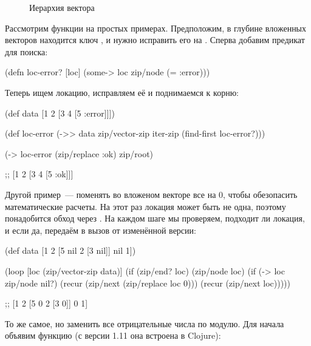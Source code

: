 \begin{figure}[ht!]
  \centering
  \caption{Иерархия вектора}
  \label{fig:chart-zip-12}
\end{figure}

Рассмотрим функции на простых примерах. Предположим, в глубине вложенных
векторов находится ключ , и нужно исправить его на . Сперва добавим
предикат для поиска:

\begin{english}
  \begin{clojure}
(defn loc-error? [loc]
  (some-> loc zip/node (= :error)))
  \end{clojure}
\end{english}

Теперь ищем локацию, исправляем её и поднимаемся к корню:

\begin{english}
  \begin{clojure}
(def data [1 2 [3 4 [5 :error]]])

(def loc-error
  (->> data
       zip/vector-zip
       iter-zip
       (find-first loc-error?)))

(-> loc-error
    (zip/replace :ok)
    zip/root)

;; [1 2 [3 4 [5 :ok]]]
  \end{clojure}
\end{english}

Другой пример~--- поменять во вложеном векторе все  на 0, чтобы обезопасить
математические расчеты. На этот раз локация может быть не одна, поэтому
понадобится обход через . На каждом шаге мы проверяем, подходит ли
локация, и если да, передаём в  вызов  от изменённой версии:

\begin{english}
  \begin{clojure}
(def data [1 2 [5 nil 2 [3 nil]] nil 1])

(loop [loc (zip/vector-zip data)]
  (if (zip/end? loc)
    (zip/node loc)
    (if (-> loc zip/node nil?)
      (recur (zip/next (zip/replace loc 0)))
      (recur (zip/next loc)))))

;; [1 2 [5 0 2 [3 0]] 0 1]
  \end{clojure}
\end{english}

То же самое, но заменить все отрицательные числа по модулю. Для начала объявим
функцию  (с версии 1.11 она встроена в Clojure):

